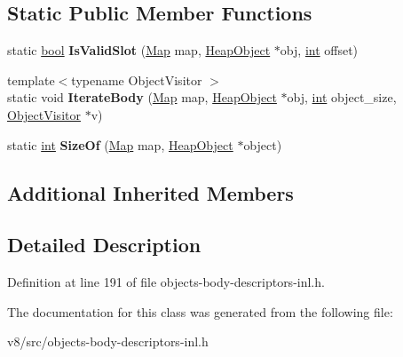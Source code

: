 \subsection*{Static Public Member Functions}
\begin{DoxyCompactItemize}
\item 
\mbox{\label{classv8_1_1internal_1_1AllocationSite_1_1BodyDescriptor_aed984ad51fc09b1478c2c3d6a6cd57a7}} 
static \mbox{\hyperlink{classbool}{bool}} {\bfseries Is\+Valid\+Slot} (\mbox{\hyperlink{classv8_1_1internal_1_1Map}{Map}} map, \mbox{\hyperlink{classv8_1_1internal_1_1HeapObject}{Heap\+Object}} $\ast$obj, \mbox{\hyperlink{classint}{int}} offset)
\item 
\mbox{\label{classv8_1_1internal_1_1AllocationSite_1_1BodyDescriptor_a3dfbfc62da64206a9b6be1117dacdffb}} 
{\footnotesize template$<$typename Object\+Visitor $>$ }\\static void {\bfseries Iterate\+Body} (\mbox{\hyperlink{classv8_1_1internal_1_1Map}{Map}} map, \mbox{\hyperlink{classv8_1_1internal_1_1HeapObject}{Heap\+Object}} $\ast$obj, \mbox{\hyperlink{classint}{int}} object\+\_\+size, \mbox{\hyperlink{classv8_1_1internal_1_1ObjectVisitor}{Object\+Visitor}} $\ast$v)
\item 
\mbox{\label{classv8_1_1internal_1_1AllocationSite_1_1BodyDescriptor_af6b5882dc09e1e886838c0b63c7b1963}} 
static \mbox{\hyperlink{classint}{int}} {\bfseries Size\+Of} (\mbox{\hyperlink{classv8_1_1internal_1_1Map}{Map}} map, \mbox{\hyperlink{classv8_1_1internal_1_1HeapObject}{Heap\+Object}} $\ast$object)
\end{DoxyCompactItemize}
\subsection*{Additional Inherited Members}


\subsection{Detailed Description}


Definition at line 191 of file objects-\/body-\/descriptors-\/inl.\+h.



The documentation for this class was generated from the following file\+:\begin{DoxyCompactItemize}
\item 
v8/src/objects-\/body-\/descriptors-\/inl.\+h\end{DoxyCompactItemize}
